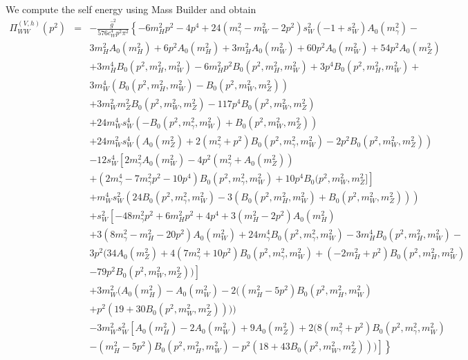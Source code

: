 \documentclass[11pt]{article}
\newcommand{\mb}{\textsf{Mass Builder} }
\begin{document}
We compute the self energy using \mb and obtain
{
\begin{eqnarray}
\Pi_{WW}^{(V,h)}(p^2) &=& 
-\frac{ \hat{g}^2} {576 c_W^4 p^2 \pi^2}\left\{ -6 m_H^2 p^2 - 4 p^4 \right.+  24 (m_{\gamma}^2 - m_W^2 - 2 p^2) s_W^2 (-1 + s_W^2) A_0(m_{\gamma}^2) -  \nonumber\\
&&   3 m_H^2 A_0(m_H^2) + 6 p^2 A_0(m_H^2) + 3 m_H^2 A_0(m_W^2) + 60 p^2 A_0(m_W^2) + 54 p^2 A_0(m_Z^2)\nonumber \\
&&   + 3 m_H^4 B_0(p^2, m_H^2, m_W^2) -6 m_H^2 p^2 B_0(p^2, m_H^2, m_W^2) + 3 p^4 B_0(p^2, m_H^2, m_W^2) + \nonumber\\
&&   3 m_W^4 (B_0(p^2, m_H^2, m_W^2) - B_0(p^2, m_W^2, m_Z^2))\nonumber \\
&&   + 3 m_W^2 m_Z^2 B_0(p^2, m_W^2, m_Z^2) - 117 p^4 B_0(p^2, m_W^2, m_Z^2) \nonumber\\
&&   + 24 m_W^4 s_W^4 (-B_0(p^2, m_{\gamma}^2, m_W^2) + B_0(p^2, m_W^2, m_Z^2))\nonumber \\
&&   + 24 m_W^2 s_W^4 (A_0(m_Z^2) + 2 (m_{\gamma}^2 + p^2) B_0(p^2, m_{\gamma}^2, m_W^2) - 2 p^2 B_0(p^2, m_W^2, m_Z^2))\nonumber \\
&&   - 12 s_W^4 \left[    2 m_{\gamma}^2 A_0(m_W^2) -  4 p^2 (m_{\gamma}^2 + A_0(m_Z^2)) \right.\nonumber \\
&& \left. + (2 m_{\gamma}^4 - 7 m_{\gamma}^2 p^2 - 10 p^4) B_0(p^2,m_{\gamma}^2, m_W^2) + 10 p^4 B_0(p^2, m_W^2, m_Z^2]\right] \nonumber\\
&&  + m_W^4 s_W^2 (24 B_0(p^2, m_{\gamma}^2, m_W^2) - 3 (B_0(p^2, m_H^2, m_W^2) + B_0(p^2, m_W^2, m_Z^2))) \nonumber\\
&&   +  s_W^2 \left[-48 m_{\gamma}^2 p^2 + 6 m_H^2 p^2 + 4 p^4 +  3 (m_H^2 - 2 p^2) A_0(m_H^2)
\right.\nonumber\\
&&   +  3 (8 m_{\gamma}^2 - m_H^2 - 20 p^2) A_0(m_W^2) +   24 m_{\gamma}^4 B_0(p^2, m_{\gamma}^2, m_W^2) - 3 m_H^4 B_0(p^2, m_H^2, m_W^2) - \nonumber\\
&&    3 p^2 (34 A_0(m_Z^2) + 4 (7 m_{\gamma}^2 + 10 p^2) B_0(p^2, m_{\gamma}^2, m_W^2) + (-2 m_H^2 + p^2) B_0(p^2, m_H^2, m_W^2) \nonumber\\
&& \left.- 79 p^2 B_0(p^2, m_W^2, m_Z^2))\right]    \nonumber\\
&& +  3 m_W^2 (A_0(m_H^2) - A_0(m_W^2) -  2 ((m_H^2 - 5 p^2) B_0(p^2, m_H^2, m_W^2)\nonumber\\
&&       + p^2 (19 + 30 B_0(p^2, m_W^2, m_Z^2))))\nonumber \\
&&     - 3 m_W^2 s_W^2 \left[A_0(m_H^2) - 2 A_0(m_W^2) + 9 A_0(m_Z^2) + 2 (8 (m_{\gamma}^2 + p^2) B_0(p^2, m_{\gamma}^2, m_W^2) \right.\nonumber\\
&& \left. \left .- (m_H^2 - 5 p^2) B_0(p^2, m_H^2, m_W^2) - p^2 (18 + 43 B_0(p^2, m_W^2, m_Z^2)))\right] \right\}\label{eqn:mb_WW}
\end{eqnarray}
}
\end{document}
